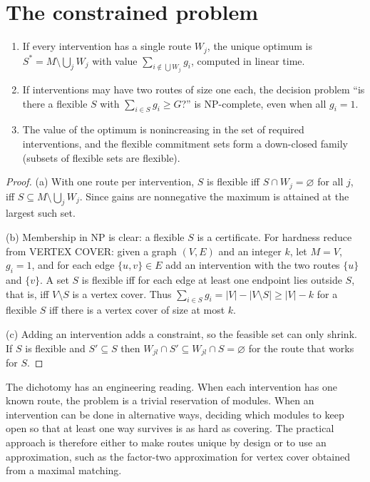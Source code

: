 \section{The constrained problem}

\begin{newresult}\label{thm:design-np}
\begin{enumerate}[nosep,label=(\alph*)]
  \item If every intervention has a single route $W_j$, the unique optimum is $S^*=M\setminus\bigcup_jW_j$ with value $\sum_{i\notin\bigcup W_j}g_i$, computed in linear time.
  \item If interventions may have two routes of size one each, the decision problem ``is there a flexible $S$ with $\sum_{i\in S}g_i\ge G$?'' is NP-complete, even when all $g_i=1$.
  \item The value of the optimum is nonincreasing in the set of required interventions, and the flexible commitment sets form a down-closed family (subsets of flexible sets are flexible).
\end{enumerate}
\end{newresult}
\begin{proof}
(a) With one route per intervention, $S$ is flexible iff $S\cap W_j=\varnothing$ for all $j$, iff $S\subseteq M\setminus\bigcup_jW_j$. Since gains are nonnegative the maximum is attained at the largest such set.

(b) Membership in NP is clear: a flexible $S$ is a certificate. For hardness reduce from VERTEX COVER: given a graph $(V,E)$ and an integer $k$, let $M=V$, $g_i=1$, and for each edge $\{u,v\}\in E$ add an intervention with the two routes $\{u\}$ and $\{v\}$. A set $S$ is flexible iff for each edge at least one endpoint lies outside $S$, that is, iff $V\setminus S$ is a vertex cover. Thus $\sum_{i\in S}g_i=|V|-|V\setminus S|\ge|V|-k$ for a flexible $S$ iff there is a vertex cover of size at most $k$.

(c) Adding an intervention adds a constraint, so the feasible set can only shrink. If $S$ is flexible and $S'\subseteq S$ then $W_{jl}\cap S'\subseteq W_{jl}\cap S=\varnothing$ for the route that works for $S$.
\end{proof}

The dichotomy has an engineering reading. When each intervention has one known route, the problem is a trivial reservation of modules. When an intervention can be done in alternative ways, deciding which modules to keep open so that at least one way survives is as hard as covering. The practical approach is therefore either to make routes unique by design or to use an approximation, such as the factor-two approximation for vertex cover obtained from a maximal matching.

